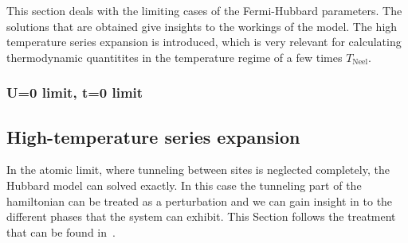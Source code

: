 \documentclass[oneside,11pt]{memoir}
\begin{document}
This section deals with the limiting cases of the Fermi-Hubbard parameters.
The solutions that are obtained give insights to the workings of the model.
The high temperature series expansion is introduced, which is very relevant for
calculating thermodynamic quantitites in the temperature regime of a few times
$T_{\mathrm{Neel}}$.  



\subsubsection { U=0 limit, t=0 limit }



\subsection{ High-temperature series expansion  }

In the atomic limit, where tunneling between sites is neglected completely, the
Hubbard model can solved exactly.  In this case the tunneling part of the
hamiltonian can be treated as a perturbation and we can gain insight in to the
different phases that the system can exhibit.  This Section follows the
treatment that can be found in~\cite{Henderson1992,Jordens2010}.   
\end{document}
